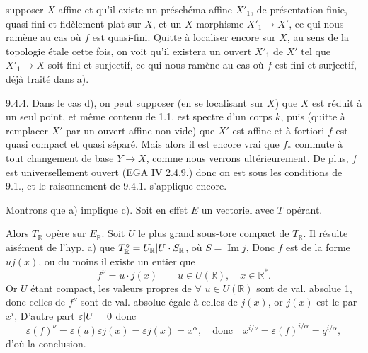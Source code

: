 

supposer $X$ affine et qu'il existe un préschéma affine $X'_1$, de présentation finie, quasi fini et fidèlement plat sur $X$, et un $X$-morphisme $X'_1\longrightarrow X'$, ce qui nous ramène au cas où $f$ est quasi-fini. Quitte à localiser encore sur $X$, au sens de la topologie étale cette fois, on voit qu'il existera un ouvert $X'_1$ de $X'$ tel que $X'_1\longrightarrow X$ soit fini et surjectif, ce qui nous ramène au cas où $f$ est fini et surjectif, déjà traité dans a).

9.4.4. Dans le cas d), on peut supposer (en se localisant sur $X$) que $X$ est réduit à un seul point, et même contenu de 1.1.  est spectre d'un corps $k$, puis (quitte à remplacer $X'$ par un ouvert affine non vide) que $X'$ est affine et à fortiori $f$ est quasi compact et quasi séparé. Mais alors il est encore vrai que $f_*$ commute à tout changement de base $Y\longrightarrow X$, comme nous verrons ultérieurement. De plus, $f$ est universellement ouvert (EGA IV 2.4.9.) donc on est sous les conditions de 9.1., et le raisonnement de 9.4.1. s'applique encore.




 Montrons que a) implique c). Soit en effet  $E$ un vectoriel   avec $T$ opérant.


Alors $T_{\mathbb R}$ opère sur $E_{\mathbb R}$. Soit $U$ le plus grand sous-tore compact de $T_{\mathbb R}$. Il résulte aisément de l'hyp. a) que $T_{\mathbb R}^\circ={U_{\mathbb R}|U}\cdot S_{\mathbb R}$, où $S=\operatorname{Im}j$,   Donc $f$ est de la forme $uj(x)$, ou du moins il existe un entier   que
\[
f^\nu=u\cdot j(x)\qquad u\in U(\mathbb R),\quad x\in\mathbb R^*.
\]
Or $U$ étant compact, les valeurs propres de $\forall$ $u\in U(\mathbb R)$ sont de val. absolue 1, donc celles de $f^\nu$ sont de val. absolue égale à celles de $j(x)$, or $j(x)$ est le    par $x^i$,  D'autre part  $\varepsilon|U={0}$ donc
\[
\varepsilon(f)^\nu=\varepsilon(u)\varepsilon j(x)=\varepsilon j(x)=x^\alpha,
\quad\text{donc}\quad x^{i/\nu}=\varepsilon(f)^{i/\alpha}=q^{i/\alpha},
\]
d'où la conclusion.

